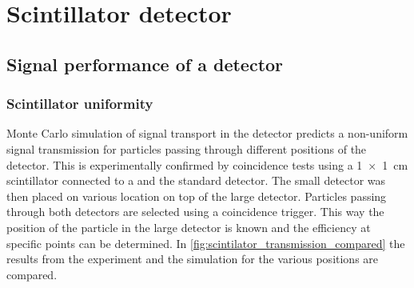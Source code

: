 \chapter{Scintillator detector}
\label{ch:detector}


\section{Signal performance of a detector}
\label{sec:detector-signal}

\subsection{Scintillator uniformity}

Monte Carlo simulation of signal transport in the detector predicts a non-uniform signal transmission for particles passing through different positions of the detector. This is experimentally confirmed by coincidence tests using a \SI[product-units = repeat]{1 x 1}{\centi\meter} scintillator connected to a \pmt and the standard detector. The small detector was then placed on various location on top of the large detector. Particles passing through both detectors are selected using a coincidence trigger. This way the position of the particle in the large detector is known and the efficiency at specific points can be determined. In \cref{fig:scintilator_transmission_compared} the results from the experiment and the simulation for the various positions are compared.


